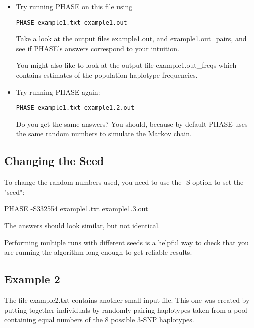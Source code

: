 \begin{itemize}
\item Try running PHASE on this file using

{\tt PHASE example1.txt example1.out}
 
Take a look at the output files example1.out, and example1.out\_pairs,
and see if PHASE's answers correspond to your intuition. 

You might also like to look at the output file example1.out\_freqs which
contains estimates of the population haplotype frequencies.


\item Try running PHASE again: 

{\tt PHASE example1.txt example1.2.out}

Do you get the same answers? You should, because by default
PHASE uses the same random numbers to simulate the Markov chain.

\end{itemize}

\es\bs

\subsection*{Changing the Seed}

To change the random numbers used, you need to use the -S option
to set the "seed":

PHASE -S332554 example1.txt example1.3.out

The answers should look similar, but not identical.

Performing multiple runs with different seeds is a helpful way to
check that you are running the algorithm long enough to get
reliable results.

\es\bs

\subsection*{Example 2}

The file example2.txt contains another small input file. This
one was created by putting together individuals by randomly
pairing haplotypes taken from a pool containing equal numbers
of the 8 possible 3-SNP haplotypes.

